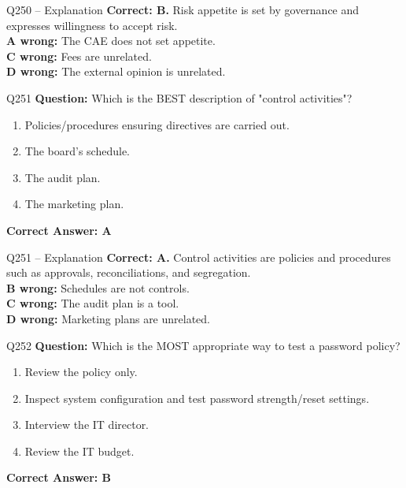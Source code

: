 \documentclass[aspectratio=169,10pt]{beamer}
\begin{document}
	\begin{frame}[t]{Q250 -- Explanation}
		\small
		\textbf{Correct: B.} Risk appetite is set by governance and expresses willingness to accept risk. \\[4pt]
		\textbf{A wrong:} The CAE does not set appetite. \\[2pt]
		\textbf{C wrong:} Fees are unrelated. \\[2pt]
		\textbf{D wrong:} The external opinion is unrelated.
	\end{frame}
	
	\begin{frame}[t]{Q251}
		\small
		\textbf{Question:} Which is the BEST description of "control activities"?
		\begin{enumerate}[label=\Alph*.,itemsep=1pt,topsep=2pt]
			\item Policies/procedures ensuring directives are carried out.
			\item The board's schedule.
			\item The audit plan.
			\item The marketing plan.
		\end{enumerate}
		\vspace{4pt}
		\textbf{Correct Answer: A}
	\end{frame}
	
	\begin{frame}[t]{Q251 -- Explanation}
		\small
		\textbf{Correct: A.} Control activities are policies and procedures such as approvals, reconciliations, and segregation. \\[4pt]
		\textbf{B wrong:} Schedules are not controls. \\[2pt]
		\textbf{C wrong:} The audit plan is a tool. \\[2pt]
		\textbf{D wrong:} Marketing plans are unrelated.
	\end{frame}
	
	\begin{frame}[t]{Q252}
		\small
		\textbf{Question:} Which is the MOST appropriate way to test a password policy?
		\begin{enumerate}[label=\Alph*.,itemsep=1pt,topsep=2pt]
			\item Review the policy only.
			\item Inspect system configuration and test password strength/reset settings.
			\item Interview the IT director.
			\item Review the IT budget.
		\end{enumerate}
		\vspace{4pt}
		\textbf{Correct Answer: B}
	\end{frame}
	
\end{document}
